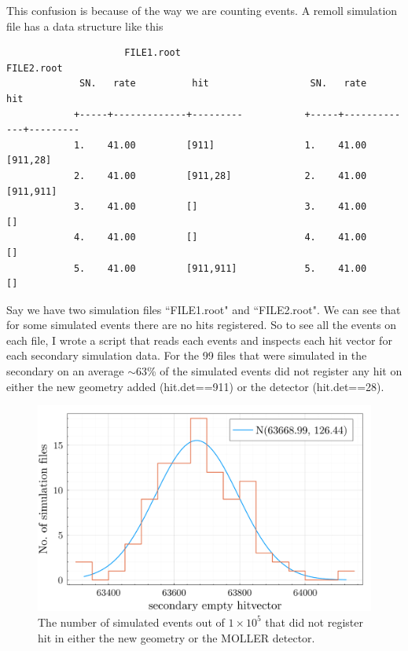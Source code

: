 \documentclass[a4paper,12pt]{article}
\begin{document}
    This confusion is because of the way we are counting events. A remoll simulation file has a data structure like this

\begin{verbatim}
                     FILE1.root                               FILE2.root
             SN.   rate          hit                  SN.   rate          hit
            +-----+-------------+---------           +-----+-------------+---------
            1.    41.00         [911]                1.    41.00         [911,28]
            2.    41.00         [911,28]             2.    41.00         [911,911]
            3.    41.00         []                   3.    41.00         []
            4.    41.00         []                   4.    41.00         []
            5.    41.00         [911,911]            5.    41.00         []    
        \end{verbatim}

    Say we have two simulation files ``FILE1.root" and ``FILE2.root". We can see that for some simulated events there are no hits registered. So to see all the events on each file, I wrote a script that reads each events and inspects each hit vector for each secondary simulation data. For the 99 files that were simulated in the secondary on an average $\sim 63$\% of the simulated events did not register any hit on either the new geometry added (hit.det==911) or the detector (hit.det==28). 
    \begin{figure}[h!]
        \centering
        \includegraphics[width=1\linewidth]{image/helicoil-20221121-113016-inspect-secondary-empty-hitvec-distrib.png}
        \caption{The number of simulated events out of $1 \times 10^{5}$ that did not register hit in either the new geometry or the MOLLER detector.}
        \label{fig:inspect-empty-hitvec-distrib}
    \end{figure}
\end{document}
